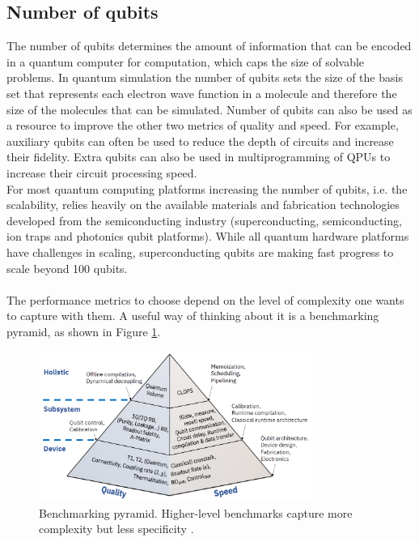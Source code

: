 \subsection{Number of qubits}
The number of qubits determines the amount of information that can be encoded in a quantum computer for computation, which caps the size of solvable problems. In quantum simulation the number of qubits sets the size of the basis set that represents each electron wave function in a molecule and therefore the size of the molecules that can be simulated. Number of qubits can also be used as a resource to improve the other two metrics of quality and speed. For example, auxiliary qubits can often be used to reduce the depth of circuits and increase their fidelity. Extra qubits can also be used in multiprogramming of QPUs to increase their circuit processing speed. \\
For most quantum computing platforms increasing the number of qubits, i.e. the scalability, relies heavily on the available materials and fabrication technologies developed from the semiconducting industry (superconducting, semiconducting, ion traps and photonics qubit platforms). While all quantum hardware platforms have challenges in scaling, superconducting qubits are making fast progress to scale beyond 100 qubits. \\
\\
The performance metrics to choose depend on the level of complexity one wants to capture with them. A useful way of thinking about it is a benchmarking pyramid, as shown in Figure \ref{Benchmarking pyramid}.
\begin{figure}[ht]
  \centering
  \includegraphics[width=0.8\textwidth]{figures/Benchmarking pyramid.png}
  \caption{Benchmarking pyramid. Higher-level benchmarks capture more complexity but less specificity \cite{Wack2021Oct}.} \label{Benchmarking pyramid}
\end{figure}

